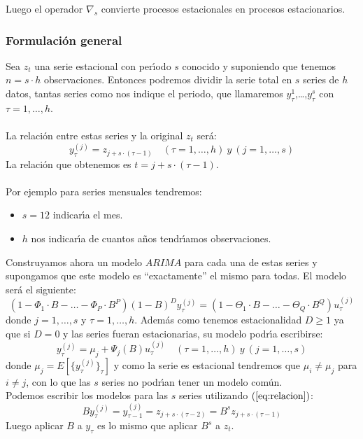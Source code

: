 Luego el operador $\nabla_s$ convierte procesos estacionales en procesos
estacionarios.

\subsubsection{Formulaci\'on general}

Sea $z_t$ una serie estacional con per\'{\i}odo $s$ conocido y suponiendo que
tenemos $n=s\cdot h$ observaciones. Entonces podremos dividir la serie total en
$s$ series de $h$ datos, tantas series como nos indique el periodo, que
llamaremos $y_{\tau}^1$,\dots,$y_{\tau}^s$ con $\tau=1,\dots,h$.\\ \\
%
La relaci\'on entre estas series y la original $z_t$ ser\'a:
\begin{equation}\label{eq:relacion}
y_{\tau}^{(j)}=z_{j+s\cdot (\tau-1)}\quad (\tau=1,\dots,h)\ y\ (j=1,\dots,s)
\end{equation}
La relaci\'on que obtenemos es $t=j+s\cdot(\tau-1)$.\\ \\
%
Por ejemplo para series mensuales tendremos:
\begin{itemize}
\item $s=12$ indicar\'{\i}a el mes.
\item $h$ nos indicar\'{\i}a de cuantos a\~nos tendr\'{\i}amos observaciones.
\end{itemize}
%
Construyamos ahora un modelo $ARIMA$ para cada una de estas series y supongamos
que este modelo es ``exactamente'' el mismo para todas. El modelo ser\'a el
siguiente:
\begin{equation}\label{eq:ModeloArima}
(1-\Phi_1\cdot B-\dots-\Phi_P\cdot B^P)(1-B)^Dy_{\tau}^{(j)}=
(1-\Theta_1\cdot B-\dots -\Theta_Q\cdot B^Q)u_{\tau}^{(j)}
\end{equation}
donde $j=1,\dots,s$ y $\tau=1,\dots,h$. Adem\'as como tenemos estacionalidad
$D\geq 1$ ya que si $D=0$ y las series fueran estacionarias, su modelo
podr\'{\i}a escribirse:
\begin{displaymath}
y_{\tau}^{(j)} = \mu_j+ \Psi_j(B)u_{\tau}^{(j)}\quad (\tau=1,\dots,h)\ y\ 
(j=1,\dots,s)
\end{displaymath}
donde $\mu_j=E[\{y_{\tau}^{(j)}\}_{\tau}]$ y como la serie es estacional
tendremos que $\mu_i\neq \mu_j$ para $i\neq j$, con lo que las $s$ series no
podr\'{\i}an tener un modelo com\'un.\\

Podemos escribir los modelos para las $s$ series utilizando
$(\ref{eq:relacion})$:
\begin{displaymath}
By_{\tau}^{(j)}= y_{\tau-1}^{(j)} = z_{j+s\cdot(\tau-2)}=
B^{s}z_{j+s\cdot(\tau-1)}
\end{displaymath}
Luego aplicar $B$ a $y_{\tau}$ es lo mismo que aplicar $B^s$ a $z_t$.\\


